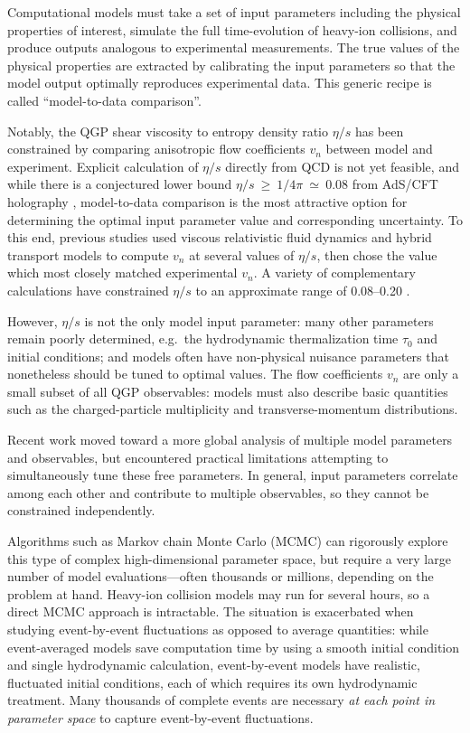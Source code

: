 \documentclass[aps,prc,reprint,superscriptaddress,amsmath]{revtex4-1}
\begin{document}
Computational models must take a set of input parameters including the physical properties of interest, simulate the full time-evolution of heavy-ion collisions, and produce outputs analogous to experimental measurements.
The true values of the physical properties are extracted by calibrating the input parameters so that the model output optimally reproduces experimental data.
This generic recipe is called ``model-to-data comparison''.

Notably, the QGP shear viscosity to entropy density ratio $\eta/s$ has been constrained by comparing anisotropic flow coefficients $v_n$ between model and experiment.
Explicit calculation of $\eta/s$ directly from QCD is not yet feasible, and while there is a conjectured lower bound $\eta/s~\geq~1/4\pi~\simeq~0.08$ from AdS/CFT holography \cite{Kovtun:2004de}, model-to-data comparison is the most attractive option for determining the optimal input parameter value and corresponding uncertainty.
To this end, previous studies used viscous relativistic fluid dynamics and hybrid transport models to compute $v_n$ at several values of $\eta/s$, then chose the value which most closely matched experimental $v_n$.
A variety of complementary calculations have constrained $\eta/s$ to an approximate range of 0.08--0.20 \cite{Luzum:2008cw,Song:2010mg,Schenke:2010rr,Luzum:2012wu}.

However, $\eta/s$ is not the only model input parameter:
many other parameters remain poorly determined, e.g.~the hydrodynamic thermalization time $\tau_0$ and initial conditions; and models often have non-physical nuisance parameters that nonetheless should be tuned to optimal values.
The flow coefficients $v_n$ are only a small subset of all QGP observables:
models must also describe basic quantities such as the charged-particle multiplicity and transverse-momentum distributions.

Recent work \cite{Soltz:2012rk} moved toward a more global analysis of multiple model parameters and observables, but encountered practical limitations attempting to simultaneously tune these free parameters.
In general, input parameters correlate among each other and contribute to multiple observables, so they cannot be constrained independently.

Algorithms such as Markov chain Monte Carlo (MCMC) can rigorously explore this type of complex high-dimensional parameter space, but require a very large number of model evaluations---often thousands or millions, depending on the problem at hand.
Heavy-ion collision models may run for several hours, so a direct MCMC approach is intractable.
The situation is exacerbated when studying event-by-event fluctuations as opposed to average quantities:
while event-averaged models save computation time by using a smooth initial condition and single hydrodynamic calculation, event-by-event models have realistic, fluctuated initial conditions, each of which requires its own hydrodynamic treatment.
Many thousands of complete events are necessary \emph{at each point in parameter space} to capture event-by-event fluctuations.
\end{document}
